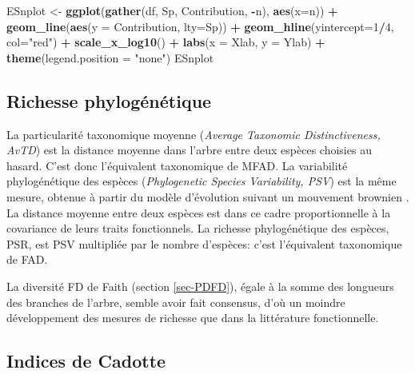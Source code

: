 \documentclass[
  11pt,
  french,
  a4paper,
  extrafontsizes,onecolumn,openright
  ]{memoir}
\newenvironment{Shaded}{\begin{snugshade}}{\end{snugshade}}
\newcommand{\DataTypeTok}[1]{\textcolor[rgb]{0.13,0.29,0.53}{#1}}
\newcommand{\DecValTok}[1]{\textcolor[rgb]{0.00,0.00,0.81}{#1}}
\newcommand{\KeywordTok}[1]{\textcolor[rgb]{0.13,0.29,0.53}{\textbf{#1}}}
\newcommand{\NormalTok}[1]{#1}
\newcommand{\OperatorTok}[1]{\textcolor[rgb]{0.81,0.36,0.00}{\textbf{#1}}}
\newcommand{\StringTok}[1]{\textcolor[rgb]{0.31,0.60,0.02}{#1}}
\begin{document}
\begin{Shaded}
\begin{Highlighting}[]
\NormalTok{ESnplot <-}\StringTok{ }\KeywordTok{ggplot}\NormalTok{(}\KeywordTok{gather}\NormalTok{(df, Sp, Contribution, }\OperatorTok{-}\NormalTok{n), }\KeywordTok{aes}\NormalTok{(}\DataTypeTok{x=}\NormalTok{n)) }\OperatorTok{+}
\StringTok{  }\KeywordTok{geom_line}\NormalTok{(}\KeywordTok{aes}\NormalTok{(}\DataTypeTok{y =}\NormalTok{ Contribution, }\DataTypeTok{lty=}\NormalTok{Sp)) }\OperatorTok{+}
\StringTok{  }\KeywordTok{geom_hline}\NormalTok{(}\DataTypeTok{yintercept=}\DecValTok{1}\OperatorTok{/}\DecValTok{4}\NormalTok{, }\DataTypeTok{col=}\StringTok{"red"}\NormalTok{) }\OperatorTok{+}
\StringTok{  }\KeywordTok{scale_x_log10}\NormalTok{() }\OperatorTok{+}
\StringTok{  }\KeywordTok{labs}\NormalTok{(}\DataTypeTok{x =}\NormalTok{ Xlab, }\DataTypeTok{y =}\NormalTok{ Ylab) }\OperatorTok{+}
\StringTok{  }\KeywordTok{theme}\NormalTok{(}\DataTypeTok{legend.position =} \StringTok{"none"}\NormalTok{)}
\NormalTok{ESnplot}
\end{Highlighting}
\end{Shaded}

\normalsize

\hypertarget{richesse-phyloguxe9nuxe9tique}{%
\subsection{Richesse phylogénétique}\label{richesse-phyloguxe9nuxe9tique}}

La particularité taxonomique moyenne \autocite{Warwick1995} (\emph{Average Taxonomic Distinctiveness, AvTD}) est la distance moyenne dans l'arbre entre deux espèces choisies au hasard.
C'est donc l'équivalent taxonomique de MFAD.
La variabilité phylogénétique des espèces \autocite{Helmus2007} (\emph{Phylogenetic Species Variability, PSV}) est la même mesure, obtenue à partir du modèle d'évolution suivant un mouvement brownien \autocite{Felsenstein1985}.
La distance moyenne entre deux espèces est dans ce cadre proportionnelle à la covariance de leurs traits fonctionnels.
La richesse phylogénétique des espèces, PSR, est PSV multipliée par le nombre d'espèces: c'est l'équivalent taxonomique de FAD.

La diversité FD de Faith (section \ref{sec-PDFD}), égale à la somme des longueurs des branches de l'arbre, semble avoir fait consensus, d'où un moindre développement des mesures de richesse que dans la littérature fonctionnelle.

\hypertarget{indices-de-cadotte}{%
\subsection{Indices de Cadotte}\label{indices-de-cadotte}}
\end{document}
